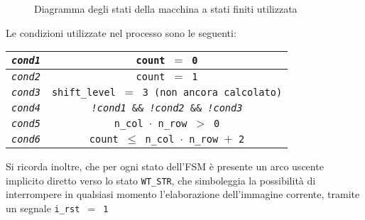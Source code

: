 \documentclass{article}
\begin{document}
\begin{figure}[ht]
    \caption{Diagramma degli stati della macchina a stati finiti utilizzata}
    \label{fig:fsm}
\end{figure}

Le condizioni utilizzate nel processo sono le seguenti:


\begin{center}
    \begin{tabular}{||c|c||}
        \hline
        \texttt{\emph{cond1}} & \texttt{count $=$ 0} \\
        \hline
        \texttt{\emph{cond2}} & \texttt{count $=$ 1} \\
        \hline
        \texttt{\emph{cond3}} & \texttt{shift\_level $=$ 3 (non ancora calcolato)} \\
        \hline
        \texttt{\emph{cond4}} & \texttt{\emph{!cond1} \&\& \emph{!cond2} \&\& \emph{!cond3}} \\   
        \hline
        \texttt{\emph{cond5}} & \texttt{n\_col $\cdot$ n\_row $>$ 0} \\
        \hline
        \texttt{\emph{cond6}} & \texttt{count $\leq$ n\_col $\cdot$ n\_row $+$ 2} \\      
        \hline
        \end{tabular}
\end{center}

Si ricorda inoltre, che per ogni stato dell'FSM è presente un arco uscente implicito diretto verso lo stato \texttt{WT\_STR}, 
che simboleggia la possibilità di interrompere in qualsiasi momento l'elaborazione dell'immagine corrente, tramite un segnale \texttt{i\_rst $=$ 1}
\end{document}
